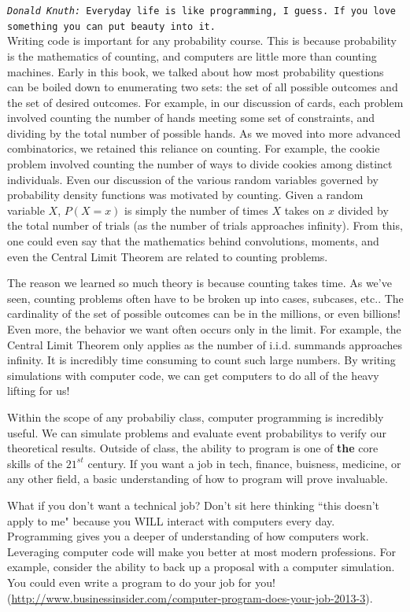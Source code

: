 \documentclass[a4paper]{article}
\begin{document}
\noindent \texttt{\emph{Donald Knuth: }Everyday life is like programming, I guess. If you love something you can put beauty into it.}
\ \\

Writing code is important for any probability course. This is because probability is the mathematics of counting, and computers are little more than counting machines. Early in this book, we talked about how most probability questions can be boiled down to enumerating two sets: the set of all possible outcomes and the set of desired outcomes. For example, in our discussion of cards, each problem involved counting the number of hands meeting some set of constraints, and dividing by the total number of possible hands. As we moved into more advanced combinatorics, we retained this reliance on counting. For example, the cookie problem involved counting the number of ways to divide cookies among distinct individuals. Even our discussion of the various random variables governed by probability density functions was motivated by counting. Given a random variable $X$, $P(X=x)$ is simply the number of times $X$ takes on $x$ divided by the total number of trials (as the number of trials approaches infinity). From this, one could even say that the mathematics behind convolutions, moments, and even the Central Limit Theorem are related to counting problems.

The reason we learned so much theory is because counting takes time. As we've seen, counting problems often have to be broken up into cases, subcases, etc.. The cardinality of the set of possible outcomes can be in the millions, or even billions! Even more, the behavior we want often occurs only in the limit. For example, the Central Limit Theorem only applies as the number of i.i.d. summands approaches infinity. It is incredibly time consuming to count such large numbers. By writing simulations with computer code, we can get computers to do all of the heavy lifting for us!

Within the scope of any probabiliy class, computer programming is incredibly useful. We can simulate problems and evaluate event probabilitys to verify our theoretical results. Outside of class, the ability to program is one of {\bf the} core skills of the $21^{st}$ century. If you want a job in tech, finance, buisness, medicine, or any other field, a basic understanding of how to program will prove invaluable.


What if you don't want a technical job? Don't sit here thinking ``this doesn't apply to me" because you WILL interact with computers every day. Programming gives you a deeper of understanding of how computers work. Leveraging computer code will make you better at most modern professions. For example, consider the ability to back up a proposal with a computer simulation. You could even write a program to do your job for you! (\url{http://www.businessinsider.com/computer-program-does-your-job-2013-3}).
\end{document}
